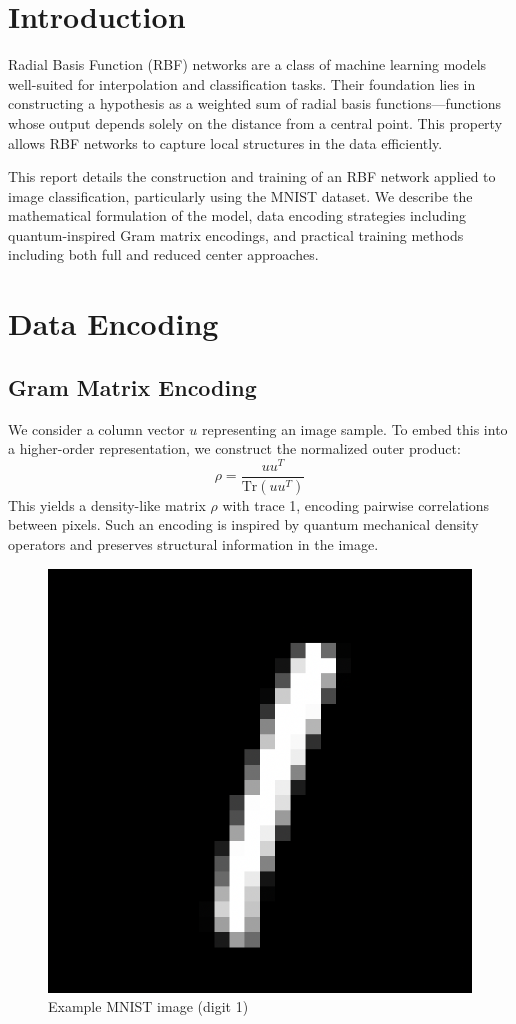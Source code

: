




\coverpage

\section{Introduction}
Radial Basis Function (RBF) networks are a class of machine learning models well-suited for interpolation and classification tasks. Their foundation lies in constructing a hypothesis as a weighted sum of radial basis functions---functions whose output depends solely on the distance from a central point. This property allows RBF networks to capture local structures in the data efficiently.

This report details the construction and training of an RBF network applied to image classification, particularly using the MNIST dataset. We describe the mathematical formulation of the model, data encoding strategies including quantum-inspired Gram matrix encodings, and practical training methods including both full and reduced center approaches.

\section{Data Encoding}
\subsection{Gram Matrix Encoding}

We consider a column vector $u$ representing an image sample. To embed this into a higher-order representation, we construct the normalized outer product:
\[
\rho = \frac{uu^T}{\text{Tr}(uu^T)}
\]
This yields a density-like matrix $\rho$ with trace 1, encoding pairwise correlations between pixels. Such an encoding is inspired by quantum mechanical density operators and preserves structural information in the image.

\begin{figure}[h!]
    \centering
    \includegraphics[width=0.6\linewidth]{figures/nmist_1_data.png}
    \caption{Example MNIST image (digit 1)}
    \label{fig:dataset_one}
\end{figure}

